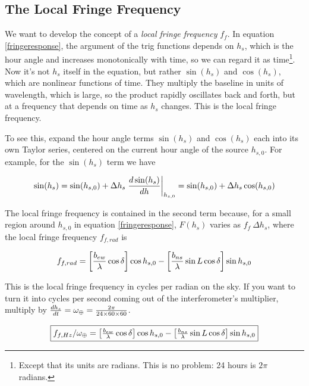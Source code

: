 \documentclass[11pt,preprint]{aastex}
\begin{document}
\subsection{The Local Fringe Frequency}

\noindent
We want to develop the concept of a {\it local fringe frequency}
$f_f$. In equation \ref{fringeresponse}, the argument of the trig functions
depends on $h_s$, which is the hour angle and increases monotonically
with time, so we can regard it as time\footnote{Except that its units
  are radians. This is no problem: 24 hours is $2\pi$ radians.}. Now
it's not $h_s$ itself in the equation, but rather $\sin( h_s)$ and
$\cos(h_s)$, which are nonlinear functions of time. They multiply the
baseline in units of wavelength, which is large, so the product rapidly
oscillates back and forth, but at a frequency that depends on time as
$h_s$ changes.  This is the local fringe frequency.

To see this, expand the hour angle terms $\sin (h_s)$ and $\cos (h_s)$
each into its own Taylor series, centered on the current hour angle of the
source $h_{s,0}$. For example, for the $\sin(h_s)$ term we have

\begin{equation} \label{taylorexpansion}
\sin (h_s) = \sin( h_{s,0}) + 
  \Delta h_s \left. {d \sin(h_s) \over dh}\right|_{h_{s,0}} = 
\sin( h_{s,0}) + \Delta h_s \cos( h_{s,0}) 
\end{equation}

\noindent The local fringe frequency is contained in the second term
because, for a small region around $h_{s,0}$ in equation
\ref{fringeresponse}, $F(h_s)$ varies as $f_f \ \Delta h_s$, where  the
local fringe frequency $f_{f,rad}$ is

\begin{equation} \label{fringefreq}
f_{f,rad} = \left[{b_{ew} \over \lambda} \cos \delta \right] \cos h_{s,0} 
- \left[{b_{ns} \over \lambda} \sin L \cos \delta \right] \sin h_{s,0}
\end{equation}

\noindent This is the local fringe frequency in cycles per radian on the
sky. If you want to turn it into cycles per second coming out of the
interferometer's multiplier, multiply by ${dh_s \over dt} = \omega_\oplus = {2\pi \over 24 \times 60 \times 60}$.

\begin{equation} \label{fringefreq} \fbox{$
f_{f,Hz}/\omega_\oplus = \left[{b_{ew} \over \lambda} \cos \delta \right] \cos h_{s,0} 
- \left[{b_{ns} \over \lambda} \sin L \cos \delta \right] \sin h_{s,0}
$}
\end{equation}
\end{document}
